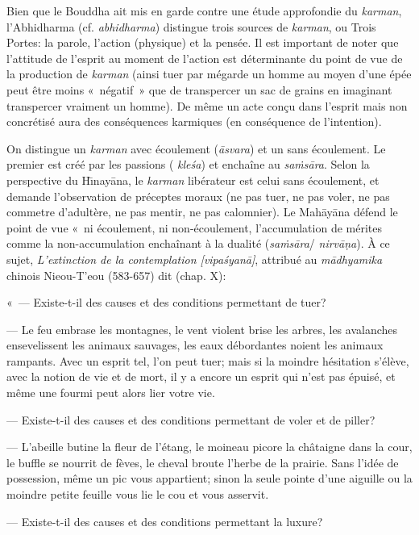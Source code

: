 \documentclass[a4paper,11pt,twocolumn]{article}
\begin{document}
Bien que le Bouddha ait mis
en garde contre une étude approfondie du {\em karman}, l'Abhidharma
(cf. {\em abhidharma}) distingue trois sources de {\em karman}, ou
Trois Portes: la parole, l'action (physique) et la pensée. Il est
important de noter
que l'attitude de l'esprit au moment de l'action est déterminante
du point de vue de la production de {\em karman} (ainsi tuer par
mégarde un homme au moyen d'une épée peut être moins «~négatif~» que de
transpercer un sac de grains en imaginant transpercer vraiment un
homme). De même un acte con\c{c}u dans l'esprit mais non concrétisé
aura des conséquences karmiques (en conséquence de l'intention).

On distingue un {\em karman} avec écoulement ({\em \={a}svara}) et un
sans écoulement. Le premier est créé par les passions ({\em
kle\'{s}a}) et enchaîne au {\em sa\.{m}s\={a}ra}. Selon la perspective
du H\={\i}nay\={a}na, le {\em karman} libérateur est celui sans
écoulement, et demande l'observation de préceptes moraux (ne pas tuer,
ne pas voler, ne pas commetre d'adultère, ne pas mentir, ne pas
calomnier). Le Mah\={a}y\={a}na défend le point de vue «~ni
écoulement, ni non-écoulement\fg, l'accumulation de mérites comme la
non-accumulation enchaînant à la dualité ({\em sa\.{m}s\={a}ra}/{\em
nirv\={a}\d{n}a}). À ce sujet, {\em L'extinction de la contemplation
[{\em vipa\'{s}yan\={a}}]}, attribué au {\em m\={a}dhyamika} chinois
Nieou-T'eou (583-657) dit (chap. X):

«~--- Existe-t-il des causes et des conditions permettant de tuer?

--- Le feu embrase les montagnes, le vent violent brise les arbres,
les avalanches ensevelissent les animaux sauvages, les eaux
débordantes noient les animaux rampants. Avec un esprit tel, l'on peut
tuer; mais si la moindre hésitation s'élève, avec la notion de vie et
de mort, il y a encore un esprit qui n'est pas épuisé, et même une
fourmi peut alors lier votre vie.

--- Existe-t-il des causes et des conditions permettant de voler et de
piller?

--- L'abeille butine la fleur de l'étang, le moineau picore la
châtaigne dans la cour, le buffle se nourrit de fèves, le cheval
broute l'herbe de la prairie. Sans l'idée de possession, même un pic
vous appartient; sinon la seule pointe d'une aiguille ou la moindre
petite feuille vous lie le cou et vous asservit.

--- Existe-t-il des causes et des conditions permettant la luxure?
\end{document}
